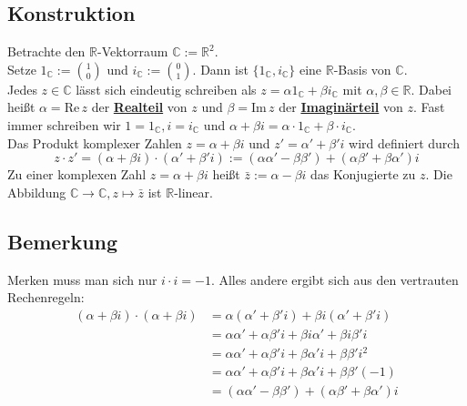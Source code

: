 \subsection{Konstruktion} %
\label{sub:konstruktion}
Betrachte den $\mathds{R}$-Vektorraum $\mathds{C} := \mathds{R}^2$. \\
Setze $1_{\mathds{C}} := \binom{1}{0}$ und $i_{\mathds{C}} := \binom{0}{1}$. Dann ist $ \{ 1_{\mathds{C}}, i_{\mathds{C}} \} $ 
eine $\mathds{R}$-Basis von $\mathds{C}$. \\
Jedes $ z \in \mathds{C}$ lässt sich eindeutig schreiben als $z= \alpha 1_{\mathds{C}} +\beta i_{\mathds{C}}$ mit 
$\alpha , \beta \in \mathds{R}$. Dabei heißt $\alpha = \text{Re} \, z$ der \underline{\textbf{Realteil}} von $z$ und 
$\beta = \text{Im} \, z$ der \underline{\textbf{Imaginärteil}} von $z$. Fast immer schreiben wir $1=1_{\mathds{C}}, i = i_{\mathds{C}}$
und $\alpha + \beta i = \alpha \cdot 1_{\mathds{C}} + \beta \cdot i_{\mathds{C}}$. 
\vspace{\baselineskip} \\
Das Produkt komplexer Zahlen $z= \alpha + \beta i$ und $z' = \alpha' + \beta' i$ wird definiert durch
\[
	z \cdot z' = (\alpha + \beta i)\cdot (\alpha' + \beta' i) := (\alpha \alpha' -\beta \beta') + (\alpha  \beta' + \beta \alpha') i
\]
Zu einer komplexen Zahl $z = \alpha + \beta i$ heißt $\bar z := \alpha - \beta i$ das Konjugierte zu $z$. Die Abbildung 
$\mathds{C} \to \mathds{C} , z \mapsto \bar z$ ist $\mathds{R}$-linear.

\subsection{Bemerkung} %
\label{sub:bemerkung}
Merken muss man sich nur $i \cdot i = -1$. Alles andere ergibt sich aus den vertrauten Rechenregeln: 
\begin{align*}
	(\alpha  + \beta i) \cdot  (\alpha + \beta i) &= \alpha (\alpha' + \beta' i) + \beta i(\alpha' + \beta' i) \\
	&= \alpha \alpha' + \alpha \beta' i + \beta i \alpha' + \beta i \beta' i \\
	&= \alpha \alpha' + \alpha \beta' i + \beta \alpha' i + \beta \beta' i^2 \\
	&= \alpha \alpha' + \alpha \beta' i + \beta \alpha' i + \beta \beta' (-1) \\
	&= (\alpha \alpha' -\beta \beta') + (\alpha  \beta' + \beta \alpha') i
\end{align*}

